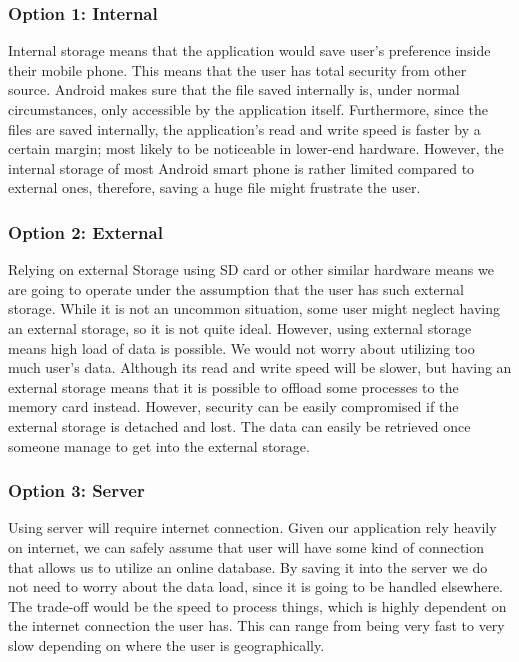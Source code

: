 \documentclass[journal,compsoc, 10pt, draftclsnofoot, onecolumn]{IEEEtran}
\begin{document}
\subsubsection{Option 1: Internal}
Internal storage means that the application would save user’s preference inside their mobile phone. This means that the user has total security from other source. Android makes sure that the file saved internally is, under normal circumstances, only accessible by the application itself. Furthermore, since the files are saved internally, the application’s read and write speed is faster by a certain margin; most likely to be noticeable in lower-end hardware. However, the internal storage of most Android smart phone is rather limited compared to external ones, therefore, saving a huge file might frustrate the user.

\subsubsection{Option 2: External}
Relying on external Storage using SD card or other similar hardware means we are going to operate under the assumption that the user has such external storage. While it is not an uncommon situation, some user might neglect having an external storage, so it is not quite ideal. However, using external storage means high load of data is possible. We would not worry about utilizing too much user’s data. Although its read and write speed will be slower, but having an external storage means that it is possible to offload some processes to the memory card instead. However, security can be easily compromised if the external storage is detached and lost. The data can easily be retrieved once someone manage to get into the external storage.

\subsubsection{Option 3: Server}
Using server will require internet connection. Given our application rely heavily on internet, we can safely assume that user will have some kind of connection that allows us to utilize an online database. By saving it into the server we do not need to worry about the data load, since it is going to be handled elsewhere. The trade-off would be the speed to process things, which is highly dependent on the internet connection the user has. This can range from being very fast to very slow depending on where the user is geographically.  
\end{document}
